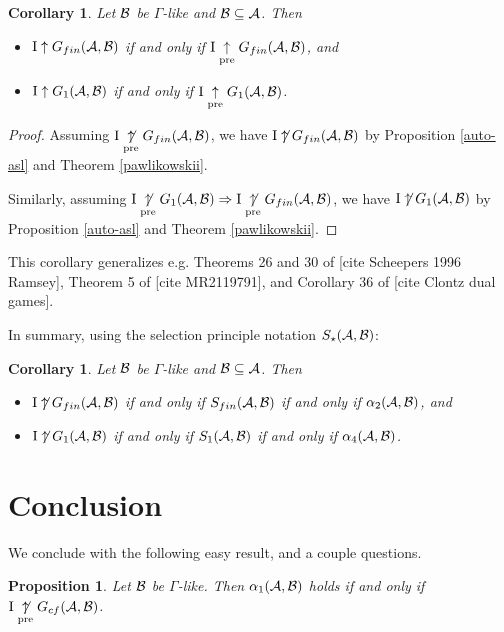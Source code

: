 \documentclass{amsart}
\theoremstyle{plain}
\newtheorem{corollary}[theorem]{Corollary}
\newtheorem{proposition}[theorem]{Proposition}
\theoremstyle{definition}
\theoremstyle{remark}
\theoremstyle{plain}
\theoremstyle{definition}
\theoremstyle{remark}
\begin{document}
\begin{corollary}
Let \(\mathcal{B}\) be \(\Gamma\)-like and \(\mathcal{B}\subseteq\mathcal{A}\).
Then 
\begin{itemize}
\item \(\mathrm{I}\uparrow G_{fin}(\mathcal{A},\mathcal{B})\) if and only if
\(\mathrm{I}\underset{\text{pre}}{\uparrow} G_{fin}(\mathcal{A},\mathcal{B})\), and
\item \(\mathrm{I}\uparrow G_{1}(\mathcal{A},\mathcal{B})\) if and only if
\(\mathrm{I}\underset{\text{pre}}{\uparrow} G_{1}(\mathcal{A},\mathcal{B})\).
\end{itemize}
\end{corollary}
\begin{proof}
Assuming \(\mathrm{I}\underset{\text{pre}}{\not\uparrow} G_{fin}(\mathcal{A},\mathcal{B})\), we have
\(\mathrm{I}\not\uparrow G_{fin}(\mathcal{A},\mathcal{B})\) by Proposition \ref{auto-asl}
and Theorem \ref{pawlikowskii}.

Similarly, assuming \(\mathrm{I}\underset{\text{pre}}{\not\uparrow} G_{1}(\mathcal{A},\mathcal{B})
\Rightarrow\mathrm{I}\underset{\text{pre}}{\not\uparrow} G_{fin}(\mathcal{A},\mathcal{B})\), we have
\(\mathrm{I}\not\uparrow G_{1}(\mathcal{A},\mathcal{B})\) by Proposition \ref{auto-asl}
and Theorem \ref{pawlikowskii}.
\end{proof}

This corollary generalizes e.g. Theorems 26 and 30 of [cite Scheepers 1996 Ramsey],
Theorem 5 of [cite MR2119791], and Corollary 36 of [cite Clontz dual games].

In summary, using the selection principle notation \(S_\star(\mathcal{A},\mathcal{B})\):

\begin{corollary}
Let \(\mathcal{B}\) be \(\Gamma\)-like and \(\mathcal{B}\subseteq\mathcal{A}\).
Then 
\begin{itemize}
\item \(\mathrm{I}\not\uparrow G_{fin}(\mathcal{A},\mathcal{B})\) if and only if
\(S_{fin}(\mathcal{A},\mathcal{B})\) if and only if
\(\alpha_2(\mathcal{A},\mathcal{B})\), and
\item \(\mathrm{I}\not\uparrow G_{1}(\mathcal{A},\mathcal{B})\) if and only if
\(S_{1}(\mathcal{A},\mathcal{B})\) if and only if
\(\alpha_4(\mathcal{A},\mathcal{B})\).
\end{itemize}
\end{corollary}

\section{Conclusion}

We conclude with the following easy result, and a couple questions.

\begin{proposition}
Let \(\mathcal{B}\) be \(\Gamma\)-like. Then \(\alpha_1(\mathcal{A},\mathcal{B})\) holds if and only
if \(\mathrm{I}\underset{\text{pre}}{\not\uparrow} G_{cf}(\mathcal{A},\mathcal{B})\).
\end{proposition}
\end{document}
